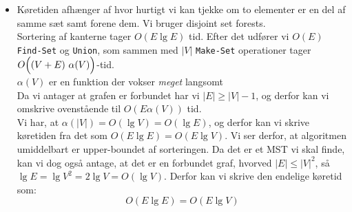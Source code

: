 \begin{itemize}
\begin{itemize}
	
	
	\item Køretiden afhænger af hvor hurtigt vi kan tjekke om to elementer er en del af samme sæt samt forene dem. Vi bruger disjoint set forests.\\
	
	Sortering af kanterne tager $O(E \lg E)$ tid. Efter det udfører vi $O(E)$ \texttt{Find-Set} og \texttt{Union}, som sammen med $|V|$ \texttt{Make-Set} operationer tager $O\Big( (V+E) \ \alpha(V) \Big)$-tid.\\
	$\alpha(V)$ er en funktion der vokser \textit{meget} langsomt\\
	
	Da vi antager at grafen er forbundet har vi $|E| \geq |V| - 1$, og derfor kan vi omskrive ovenstående til $O(E \alpha(V))$ tid.\\
	
	Vi har, at $\alpha(|V|) = O(\lg V) = O(\lg E)$, og derfor kan vi skrive køretiden fra det som $O(E \lg E) = O(E \lg V)$. Vi ser derfor, at algoritmen umiddelbart er upper-boundet af sorteringen.
	Da det er et MST vi skal finde, kan vi dog også antage, at det er en forbundet graf, hvorved $|E| \leq |V|^2$, så $\lg E = \lg V^2 = 2\lg V = O(\lg V)$. Derfor kan vi skrive den endelige køretid som:
	$$
	O(E \lg E) = O(E \lg V)
	$$
\end{itemize}




\end{itemize}
